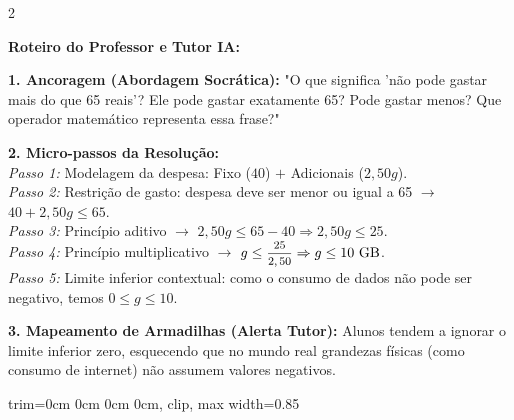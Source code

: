 \begin{multicols*}{2}
\ifgabarito
    \begin{tcolorbox}[colback=CorTitUm!5, colframe=CorTitUm, boxrule=1pt, arc=4pt, left=6pt, right=6pt, top=6pt, bottom=6pt]
    \small\textbf{\textcolor{CorTitUm}{Roteiro do Professor e Tutor IA:}}\par\vspace{0.1cm}
    \color{CinzaEscuro}
    \textbf{1. Ancoragem (Abordagem Socrática):} "O que significa 'não pode gastar mais do que 65 reais'? Ele pode gastar exatamente 65? Pode gastar menos? Que operador matemático representa essa frase?"\par\vspace{0.1cm}
    
    \textbf{2. Micro-passos da Resolução:}\\
    \textit{Passo 1:} Modelagem da despesa: Fixo ($40$) $+$ Adicionais ($2,50g$).\\
    \textit{Passo 2:} Restrição de gasto: despesa deve ser menor ou igual a 65 $\rightarrow$ $40 + 2,50g \le 65$.\\
    \textit{Passo 3:} Princípio aditivo $\rightarrow$ $2,50g \le 65 - 40 \Rightarrow 2,50g \le 25$.\\
    \textit{Passo 4:} Princípio multiplicativo $\rightarrow$ $g \le \mfrac{25}{2,50} \Rightarrow g \le 10 \text{ GB}$.\\
    \textit{Passo 5:} Limite inferior contextual: como o consumo de dados não pode ser negativo, temos $0 \le g \le 10$.\par\vspace{0.1cm}
    
    \textbf{3. Mapeamento de Armadilhas (Alerta Tutor):} Alunos tendem a ignorar o limite inferior zero, esquecendo que no mundo real grandezas físicas (como consumo de internet) não assumem valores negativos.
    
    \begin{center}
    \begin{adjustbox}{trim=0cm 0cm 0cm 0cm, clip, max width=0.85\linewidth}
\end{adjustbox}
\end{center}
\end{tcolorbox}
\end{multicols*}
